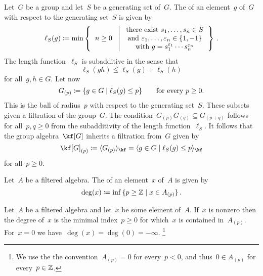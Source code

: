 \begin{examples}
\begin{enumerate}
			Let~$G$ be a group and let~$S$ be a generating set of~$G$.
			The  of an element~$g$ of~$G$ with respect to the generating set~$S$ is given by
			\[
				\ell_S(g)
				\defined
				\min
				\left\{
					\begin{tabular}{c}
						$n \geq 0$
					\end{tabular}
				\suchthat*
					\begin{tabular}{c}
						there exist~$s_1, \dotsc, s_n \in S$ \\
						and~$\varepsilon_1, \dots, \varepsilon_n \in \{1, -1\}$ \\
						with~$g = s_1^{\varepsilon_1} \dotsm s_n^{\varepsilon_n}$
					\end{tabular}
				\right\}  \,.
			\]
			The length function~$\ell_S$ is subadditive in the sense that
			\[
				\ell_S(gh)
				\leq
				\ell_S(g) + \ell_S(h)
			\]
			for all~$g, h \in G$.
			Let now
			\[
				G_{(p)}
				\defined
				\{
					g \in G
				\suchthat
					\ell_S(g) \leq p
				\}
				\qquad
				\text{for every~$p \geq 0$.}
			\]
			This is the ball of radius~$p$ with respect to the generating set~$S$.
			These subsets given a filtration of the group~$G$.
			The condition~$G_{(p)} G_{(q)} \subseteq G_{(p + q)}$ follows for all~$p, q \geq 0$ from the subadditivity of the length function~$\ell_S$.
			It follows that the group algebra~$\kf[G]$ inherits a filtration from~$G$ given by
			\[
				\kf[G]_{(p)}
				\defined
				\gen{ G_{(p)} }_{\kf}
				=
				\gen{
					g \in G
				\suchthat
					\ell_S(g) \leq p
				}_{\kf} 
			\]
			for all~$p \geq 0$.
	\end{enumerate}
\end{examples}


\begin{definition}
	Let~$A$ be a filtered algebra.
	The  of an element~$x$ of~$A$ is given by
	\[
		\deg(x)
		\defined
		\inf
		{}
		\{
			p \geq \Integer
		\suchthat
			x \in A_{(p)}
		\} \,.
	\]
\end{definition}


\begin{remark}
	Let~$A$ be a filtered algebra and let~$x$ be some element of~$A$.
	If~$x$ is nonzero then the degree of~$x$ is the minimal index~$p \geq 0$ for which~$x$ is contained in~$A_{(p)}$.
	For~$x = 0$ we have~$\deg(x) = \deg(0) = -\infty$.%
	\footnote{We use the the convention~$A_{(p)} = 0$ for every~$p < 0$, and thus~$0 \in A_{(p)}$ for every~$p \in \mathbb{Z}$.}
\end{remark}


